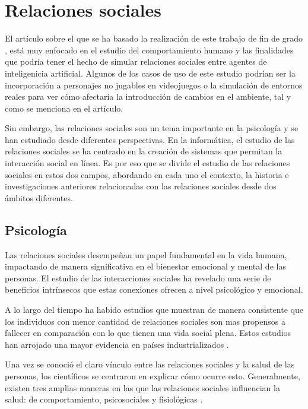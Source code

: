 \section{Relaciones sociales}

El artículo sobre el que se ha basado la realización de este trabajo de fin de grado \citep{park2023generative}, está muy enfocado en el estudio del comportamiento humano y las finalidades que podría tener el hecho de simular relaciones sociales entre agentes de inteligenicia artificial. Algunos de los casos de uso de este estudio podrían ser la incorporación a personajes no jugables en videojuegos o la simulación de entornos reales para ver cómo afectaría la introducción de cambios en el ambiente, tal y como se menciona en el artículo.

Sin embargo, las relaciones sociales son un tema importante en la psicología y se han estudiado desde diferentes perspectivas. En la informática, el estudio de las relaciones sociales se ha centrado en la creación de sistemas que permitan la interacción social en línea. Es por eso que se divide el estudio de las relaciones sociales en estos dos campos, abordando en cada uno el contexto, la historia e investigaciones anteriores relacionadas con las relaciones sociales desde dos ámbitos diferentes.

\subsection{Psicología}

Las relaciones sociales desempeñan un papel fundamental en la vida humana, impactando de manera significativa en el bienestar emocional y mental de las personas. El estudio de las interacciones sociales ha revelado una serie de beneficios intrínsecos que estas conexiones ofrecen a nivel psicológico y emocional.

A lo largo del tiempo ha habido estudios que muestran de manera consistente que los individuos con menor cantidad de relaciones sociales son mas propensos a fallecer en comparación con lo que tienen una vida social plena. Estos estudios han arrojado una mayor evidencia en países industrializados \citep{House1988}.

Una vez se conoció el claro vínculo entre las relaciones sociales y la salud de las personas, los científicos se centraron en explicar cómo ocurre esto. Generalmente, existen tres amplias maneras en las que las relaciones sociales influencian la salud: de comportamiento, psicosociales y fisiológicas \citep{doi:10.1177/0022146510383501}.


